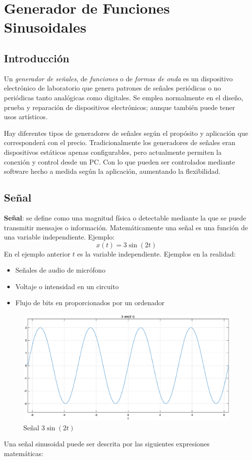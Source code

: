 \documentclass[11pt]{article}
\begin{document}
\section{Generador de Funciones Sinusoidales}
\subsection{Introducción}

Un \emph{generador de señales}, de \emph{funciones} o de
\emph{formas de onda} es un dispositivo electrónico de
laboratorio que genera patrones de señales periódicas o no
periódicas tanto analógicas como digitales. Se emplea
normalmente en el diseño, prueba y reparación de dispositivos
electrónicos; aunque también puede tener usos artísticos.

Hay diferentes tipos de generadores de señales según el
propósito y aplicación que corresponderá con el precio.
Tradicionalmente los generadores de señales eran dispositivos
estáticos apenas configurables, pero actualmente permiten la
conexión y control desde un PC. Con lo que pueden ser
controlados mediante software hecho a medida según la
aplicación, aumentando la flexibilidad. \citep{gdf}

\subsection{Señal}
\textbf{Señal}: se define como una magnitud física o detectable
mediante la que se puede transmitir mensajes o información.
Matemáticamente una señal es una función de una variable
independiente. Ejemplo:
$$x(t) = 3\sin(2t)$$
En el ejemplo anterior $t$ es la variable independiente.
Ejemplos en la realidad:
\begin{itemize}
\item Señales de audio de micrófono
\item Voltaje o intensidad en un circuito
\item Flujo de bits en proporcionados por un ordenador
\citep{iss}
\end{itemize}

\begin{figure}[h]
\centering
\includegraphics[scale=0.3]{pics/3sin2t.eps} 
\caption{Señal $3\sin(2t)$}
\end{figure}
\newpage
Una señal sinusoidal puede ser descrita por las siguientes
expresiones matemáticas:
\end{document}
